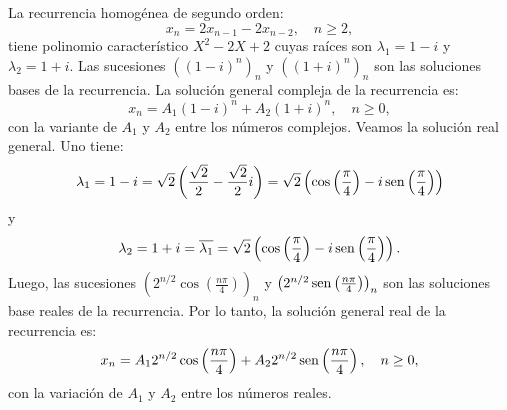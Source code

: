 \begin{example}
	La recurrencia homogénea de segundo orden: \[ x_{n}=2x_{n-1}-2x_{n-2},\quad n\geq2, \] tiene polinomio característico $X^{2}-2X+2$ cuyas raíces son $\lambda_{1}=1-i$ y $\lambda_{2}=1+i$. Las sucesiones ${\left((1-i)^{n}\right)}_{n}$ y ${\left((1+i)^{n}\right)}_{n} $ son las soluciones bases de la recurrencia. La solución general compleja de la recurrencia es: \[ x_{n}=A_{1}{\left(1-i\right)}^{n}+A_{2}{\left(1+i\right)}^{n},\quad n\geq 0, \] con la variante de $A_{1}$ y $A_{2}$ entre los números complejos. Veamos la solución real general. Uno tiene: \[ \lambda_{1}=1-i=\sqrt{2}\left(\frac{\sqrt{2}}{2}-\frac{\sqrt{2}}{2}i\right)=\sqrt{2}\left(\cos\left(\frac{\pi}{4}\right)-i\operatorname{sen}\left(\frac{\pi}{4}\right)\right) \] y \[ \lambda_{2}=1+i=\overline{\lambda_{1}}=\sqrt{2}\left(\cos\left(\frac{\pi}{4}\right)-i\operatorname{sen}\left(\frac{\pi}{4}\right)\right). \] Luego, las sucesiones ${\left(2^{n/2}\cos\left( \frac{n\pi}{4}\right)\right)}_{n}$ y ${\left(2^{n/2}\operatorname{sen}\left(\frac{n\pi}{4}\right)\right)}_{n}$ son las soluciones base reales de la recurrencia. Por lo tanto, la solución general real de la recurrencia es: \[ x_{n}=A_{1}2^{n/2}\cos\left(\frac{n\pi}{4}\right)+A_{2}2^{n/2}\operatorname{sen}\left(\frac{n\pi}{4}\right),\quad n\geq 0, \] con la variación de $A_{1}$ y $A_{2}$ entre los números reales.
\end{example}

